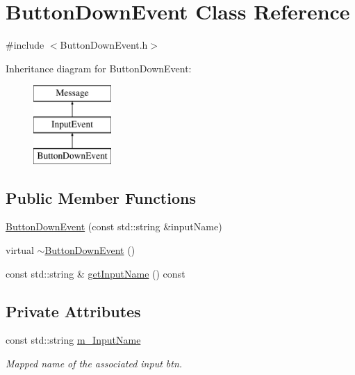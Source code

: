 \hypertarget{class_button_down_event}{}\section{Button\+Down\+Event Class Reference}
\label{class_button_down_event}


{\ttfamily \#include $<$Button\+Down\+Event.\+h$>$}

Inheritance diagram for Button\+Down\+Event\+:\begin{figure}[H]
\begin{center}
\leavevmode
\includegraphics[height=3.000000cm]{class_button_down_event}
\end{center}
\end{figure}
\subsection*{Public Member Functions}
\begin{DoxyCompactItemize}
\item 
\hyperlink{class_button_down_event_ada6dbeac39500334c9e5c62503b41c8f}{Button\+Down\+Event} (const std\+::string \&input\+Name)
\item 
virtual \hyperlink{class_button_down_event_a61d89663686845499cc361d33beb1179}{$\sim$\+Button\+Down\+Event} ()
\item 
const std\+::string \& \hyperlink{class_button_down_event_a9c70a3a61c0721eaeb926156276efaa6}{get\+Input\+Name} () const 
\end{DoxyCompactItemize}
\subsection*{Private Attributes}
\begin{DoxyCompactItemize}
\item 
const std\+::string \hyperlink{class_button_down_event_a2880f23f03f0360a60481e3ebe974391}{m\+\_\+\+Input\+Name}
\begin{DoxyCompactList}\small\item\em Mapped name of the associated input btn. \end{DoxyCompactList}\end{DoxyCompactItemize}


